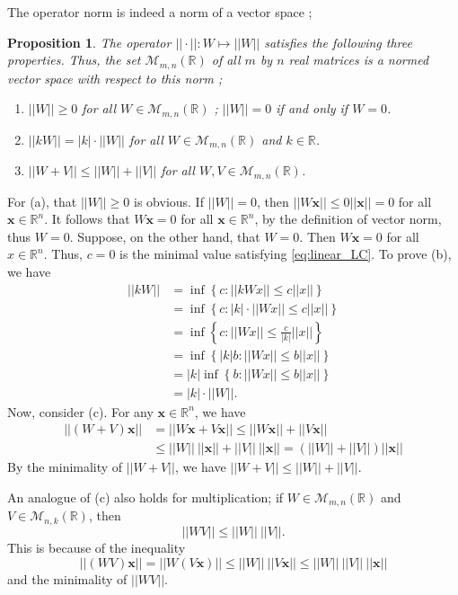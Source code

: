\documentclass[11pt]{report}
\newtheorem{proposition}{Proposition} %
\newcommand\bx{\ensuremath{\boldsymbol x}}
\begin{document}
The operator norm is indeed a norm of a vector space ;
\begin{proposition}\label{prop:operator_norm_1}
The operator \(||\cdot||:W\mapsto||W||\) satisfies the following three properties.
Thus, the set \(\mathcal M_{m,n}(\mathbb R)\) of all \(m\) by \(n\) real matrices is a normed vector space with respect to this norm ;
\begin{enumerate}[label=(\alph*)]
\item
\(||W||\ge0\) for all \(W\in\mathcal M_{m,n}(\mathbb R)\) ; \(||W||=0\) if and only if \(W=0\).
\item
\(||kW||=|k|\cdot||W||\) for all \(W\in\mathcal M_{m,n}(\mathbb R)\) and \(k\in\mathbb R\).
\item
\(||W+V||\le||W||+||V||\) for all \(W,V\in\mathcal M_{m,n}(\mathbb R)\).
\end{enumerate}
\end{proposition}
For (a), that \(||W||\ge0\) is obvious.
If \(||W||=0\), then \(||W\bx||\le 0||\bx||=0\) for all \(\bx\in\mathbb R^n\).
It follows that \(W\bx=0\) for all \(\bx\in\mathbb R^n\), by the definition of vector norm, thus \(W=0\).
Suppose, on the other hand, that \(W=0\). Then \(W\bx=0\) for all \(x\in\mathbb R^n\).
Thus, \(c=0\) is the minimal value satisfying \eqref{eq:linear_LC}.
To prove (b), we have
\begin{align*}
||kW||
&=\inf\left\{c:||kWx||\le c||x||\right\}\\
&=\inf\left\{c:|k|\cdot||Wx||\le c||x||\right\}\\
&=\inf\left\{c:||Wx||\le\frac{c}{|k|}||x||\right\}\\
&=\inf\left\{|k|b:||Wx||\le b||x||\right\}\\
&=|k|\inf\left\{b:||Wx||\le b||x||\right\}\\
&=|k|\cdot||W||.
\end{align*}
Now, consider (c).
For any \(\bx\in\mathbb R^n\), we have
\begin{align*}
||(W+V)\bx||
&=||W\bx+V\bx||\le||W\bx||+||V\bx||\\
&\le||W||\:||\bx||+||V||\:||\bx||=(||W||+||V||)||\bx||
\end{align*}
By the minimality of \(||W+V||\), we have \(||W+V||\le||W||+||V||\).

An analogue of (c) also holds for multiplication;
if \(W\in\mathcal M_{m,n}(\mathbb R)\) and \(V\in\mathcal M_{n,k}(\mathbb R)\), then
\begin{equation}\label{eq:multiplicative_inequality}
||WV||\le||W||\:||V||.
\end{equation}
This is because of the inequality
\[||(WV)\bx||=||W(V\bx)||\le||W||\:||V\bx||\le||W||\:||V||\:||\bx||\]
and the minimality of \(||WV||\).
\end{document}
